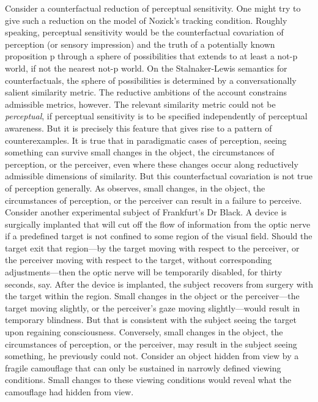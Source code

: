 \documentclass[12pt]{article}
\begin{document}
Consider a counterfactual reduction of perceptual sensitivity. One might try to give such a reduction on the model of Nozick's \citeyearpar{Nozick:1981fk} tracking condition. Roughly speaking, perceptual sensitivity would be the counterfactual covariation of perception (or sensory impression) and the truth of a potentially known proposition p through a sphere of possibilities that extends to at least a not-p world, if not the nearest not-p world. On the Stalnaker-Lewis semantics for counterfactuals, the sphere of possibilities is determined by a conversationally salient similarity metric. The reductive ambitions of the account constrains admissible metrics, however. The relevant similarity metric could not be \emph{perceptual}, if perceptual sensitivity is to be specified independently of perceptual awareness. But it is precisely this feature that gives rise to a pattern of counterexamples. It is true that in paradigmatic cases of perception, seeing something can survive small changes in the object, the circumstances of perception, or the perceiver, even where these changes occur along reductively admissible dimensions of similarity. But this counterfactual covariation is not true of perception generally.  As \citet{Johnston:2006uq} observes, small changes, in the object, the circumstances of perception, or the perceiver can result in a failure to perceive. Consider another experimental subject of Frankfurt's \citeyearpar{Frankfurt:1969kx} Dr Black. A device is surgically implanted that will cut off the flow of information from the optic nerve if a predefined target is not confined to some region of the visual field. Should the target exit that region---by the target moving with respect to the perceiver, or the perceiver moving with respect to the target, without corresponding adjustments---then the optic nerve will be temporarily disabled, for thirty seconds, say. After the device is implanted, the subject recovers from surgery with the target within the region. Small changes in the object or the perceiver---the target moving slightly, or the perceiver's gaze moving slightly---would result in temporary blindness. But that is consistent with the subject seeing the target upon regaining consciousness. Conversely, small changes in the object, the circumstances of perception, or the perceiver, may result in the subject seeing something, he previously could not. Consider an object hidden from view by a fragile camouflage that can only be sustained in narrowly defined viewing conditions. Small changes to these viewing conditions would reveal what the camouflage had hidden from view.
\end{document}
